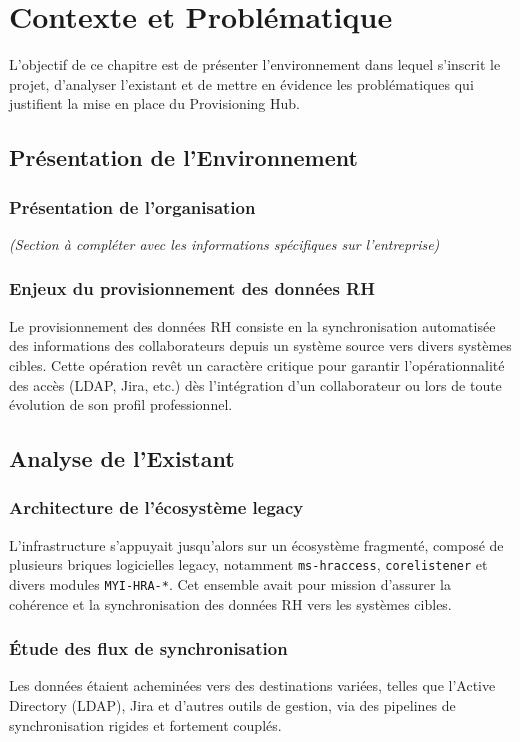 \chapter{Contexte et Problématique}
\label{chap:contexte}

L'objectif de ce chapitre est de présenter l'environnement dans lequel s'inscrit le projet, d'analyser l'existant et de mettre en évidence les problématiques qui justifient la mise en place du Provisioning Hub.

\section{Présentation de l'Environnement}
\label{sec:environnement}

\subsection{Présentation de l'organisation}
\textit{(Section à compléter avec les informations spécifiques sur l'entreprise)}

\subsection{Enjeux du provisionnement des données RH}
Le provisionnement des données RH consiste en la synchronisation automatisée des informations des collaborateurs depuis un système source vers divers systèmes cibles. Cette opération revêt un caractère critique pour garantir l'opérationnalité des accès (LDAP, Jira, etc.) dès l'intégration d'un collaborateur ou lors de toute évolution de son profil professionnel.

\section{Analyse de l'Existant}
\label{sec:existant}

\subsection{Architecture de l'écosystème legacy}
L'infrastructure s'appuyait jusqu'alors sur un écosystème fragmenté, composé de plusieurs briques logicielles legacy, notamment \texttt{ms-hraccess}, \texttt{corelistener} et divers modules \texttt{MYI-HRA-*}. Cet ensemble avait pour mission d'assurer la cohérence et la synchronisation des données RH vers les systèmes cibles.

\subsection{Étude des flux de synchronisation}
Les données étaient acheminées vers des destinations variées, telles que l'Active Directory (LDAP), Jira et d'autres outils de gestion, via des pipelines de synchronisation rigides et fortement couplés.

